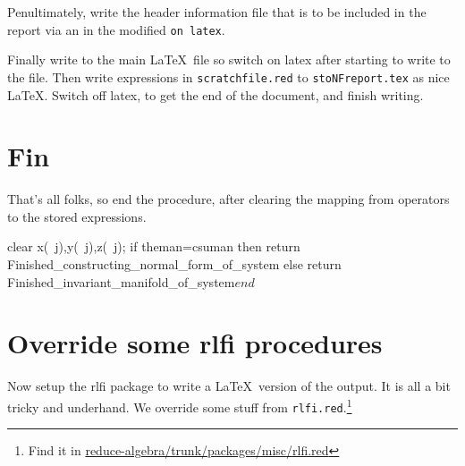 \documentclass[11pt,a5paper]{article}
\def\ou\big(#1,#2,#3\big)%
\def\eps{\ensuremath{\varepsilon}}
\begin{document}
Penultimately, write the header information file that is 
to be included in the report via an \verb|| in the 
modified \verb|on latex|.


Finally write to the main \LaTeX\ file so switch on latex
after starting to write to the file. Then write expressions
in \verb|scratchfile.red| to \verb|stoNFreport.tex| as nice
\LaTeX. Switch off latex, to get the end of the document,
and finish writing.


\section{Fin}
That's all folks, so end the procedure, after clearing the
mapping from operators to the stored expressions. 
\begin{reduce}
clear x(~j),y(~j),z(~j);
if theman=csuman 
then return Finished_constructing_normal_form_of_system 
else return Finished_invariant_manifold_of_system$ 
end$
\end{reduce}





\section{Override some rlfi procedures}

Now setup the rlfi package to write a \LaTeX\ version of the
output. It is all a bit tricky and underhand. We override
some stuff from \verb|rlfi.red|.\footnote{Find it in
\url{reduce-algebra/trunk/packages/misc/rlfi.red}}  
\end{document}
